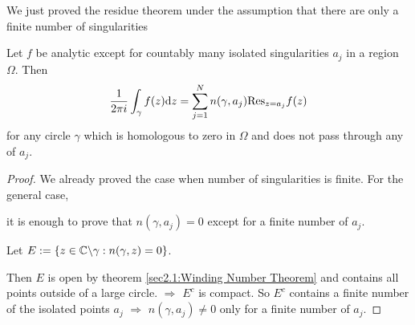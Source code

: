 We just proved the residue theorem under the assumption that there are only a finite number of singularities
\begin{theorem}\label{sec:5.5.1:The Residue Theorem}
    Let  $ f  $ be analytic except for countably many isolated singularities  $ a_j  $ in a region $ \Omega  $. Then
    \begin{equation}
        \frac{1}{2\pi i}\int_\gamma f(z)\mathrm{d} z=\sum_{j=1}^N n(\gamma,a_j)\mathrm{Res}_{z=a_j}f(z)
    \end{equation}
    for any circle  $ \gamma    $ which is homologous to zero in  $ \Omega  $ and does not pass through any of  $ a_j $. 
\end{theorem}
\begin{proof}
    We already proved the case when  number of singularities is finite. For the general case,

    it is enough to prove that  $ n(\gamma,a_j)=0 $ except for a finite number of  $ a_j $.
    
    Let  $ E:=\{z\in \mathbb C\backslash\gamma:n(\gamma,z)=0\} $.
    
    Then  $ E  $ is open by theorem \ref{sec2.1:Winding Number Theorem} and contains all points outside of a large circle.  $ \Rightarrow  $  $ E^c $ is compact. So  $ E^c $ contains a finite number of the isolated points  $ a_j $ $ \Rightarrow  $  $ n(\gamma,a_j)\neq 0 $ only for a finite number of  $ a_j $.   
\end{proof}
